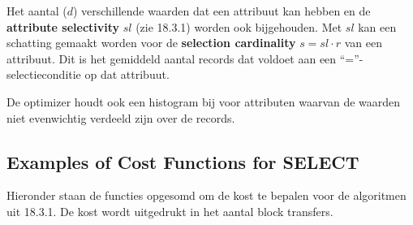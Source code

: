 Het aantal ($d$) verschillende waarden dat een attribuut kan hebben en de \textbf{attribute selectivity} $\textit{sl}$ (zie 18.3.1) worden ook bijgehouden. Met $\textit{sl}$ kan een schatting gemaakt worden voor de \textbf{selection cardinality} $s = \textit{sl} \cdot r$ van een attribuut. Dit is het gemiddeld aantal records dat voldoet aan een ``=''-selectieconditie op dat attribuut.

De optimizer houdt ook een histogram bij voor attributen waarvan de waarden niet evenwichtig verdeeld zijn over de records.


\subsection{Examples of Cost Functions for SELECT}
Hieronder staan de functies opgesomd om de kost te bepalen voor de algoritmen uit 18.3.1. De kost wordt uitgedrukt in het aantal block transfers.
